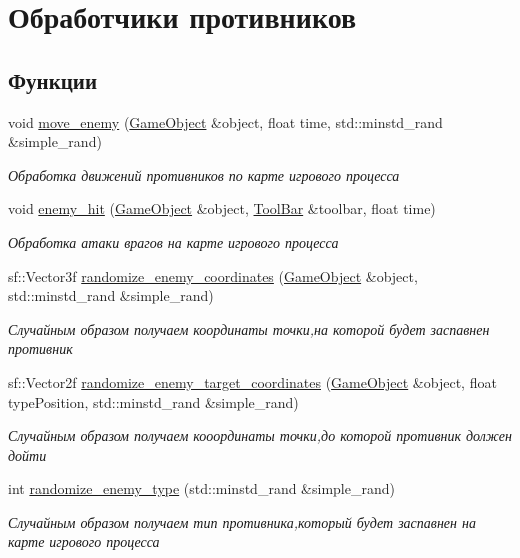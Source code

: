 \hypertarget{group__enemyHandler}{}\section{Обработчики противников}
\label{group__enemyHandler}
\subsection*{Функции}
\begin{DoxyCompactItemize}
\item 
void \hyperlink{group__enemyHandler_ga95a06e0efaa583439b679f0b28419ba9}{move\+\_\+enemy} (\hyperlink{classGameObject}{Game\+Object} \&object, float time, std\+::minstd\+\_\+rand \&simple\+\_\+rand)
\begin{DoxyCompactList}\small\item\em Обработка движений противников по карте игрового процесса \end{DoxyCompactList}\item 
void \hyperlink{group__enemyHandler_ga6965d0b7bc93883e1089dd9a326a584a}{enemy\+\_\+hit} (\hyperlink{classGameObject}{Game\+Object} \&object, \hyperlink{classToolBar}{Tool\+Bar} \&toolbar, float time)
\begin{DoxyCompactList}\small\item\em Обработка атаки врагов на карте игрового процесса \end{DoxyCompactList}\item 
sf\+::\+Vector3f \hyperlink{group__enemyHandler_gacc579aee4d796c717e760e72c1c75ec3}{randomize\+\_\+enemy\+\_\+coordinates} (\hyperlink{classGameObject}{Game\+Object} \&object, std\+::minstd\+\_\+rand \&simple\+\_\+rand)
\begin{DoxyCompactList}\small\item\em Случайным образом получаем координаты точки,на которой будет заспавнен противник \end{DoxyCompactList}\item 
sf\+::\+Vector2f \hyperlink{group__enemyHandler_ga778c7ea2e26eb1d80652bf61d1661fb1}{randomize\+\_\+enemy\+\_\+target\+\_\+coordinates} (\hyperlink{classGameObject}{Game\+Object} \&object, float type\+Position, std\+::minstd\+\_\+rand \&simple\+\_\+rand)
\begin{DoxyCompactList}\small\item\em Случайным образом получаем кооординаты точки,до которой противник должен дойти \end{DoxyCompactList}\item 
int \hyperlink{group__enemyHandler_ga21c57a411b6aa06a0f36c9eefab38b5b}{randomize\+\_\+enemy\+\_\+type} (std\+::minstd\+\_\+rand \&simple\+\_\+rand)
\begin{DoxyCompactList}\small\item\em Случайным образом получаем тип противника,который будет заспавнен на карте игрового процесса \end{DoxyCompactList}\end{DoxyCompactItemize}


